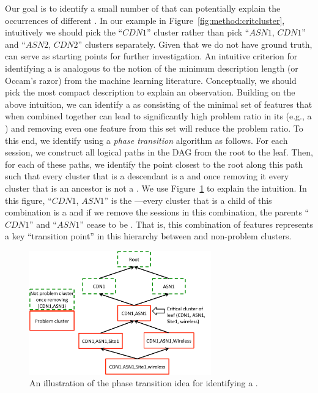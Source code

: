 Our goal is to identify a small number of {\em \criticalclusters} 
that can potentially explain the occurrences of different 
\problemclusters.  
In our example in Figure~\ref{fig:method:critcluster}, intuitively 
we should pick the ``$\mathit{CDN1}$'' cluster rather than pick 
``$\mathit{ASN1}$, $\mathit{CDN1}$'' and ``$\mathit{ASN2}$, 
$\mathit{CDN2}$'' clusters separately.
Given that we do not have ground truth, \criticalclusters can 
serve as  starting points for further investigation. 
%
An intuitive criterion for  identifying a \criticalcluster is 
analogous to the notion of the minimum description length 
(or Occam's razor) from the machine learning literature. 
Conceptually, we should pick the most  compact description
to explain an observation.  Building on the above intuition, 
we can identify a \criticalcluster as consisting of the minimal 
set of features that when combined together can lead to 
significantly high problem ratio in its \cluster
(e.g., a \problemcluster) and removing even one feature
 from this set will reduce the problem ratio. 
To this end, we identify \criticalclusters using a \emph{phase
transition} algorithm as follows. 
For each session, we construct all logical paths in the DAG 
from the root to the leaf.  
Then, for each of these paths, we identify the point closest 
to the root along this path such that every cluster that is a 
descendant  is a \problemcluster and once removing it every 
cluster that is an ancestor is not a \problemcluster.
We use Figure~\ref{fig:method:critclustr2} to explain the intuition. 
In this figure, ``$\mathit{CDN1}$, $\mathit{ASN1}$'' is the 
\criticalcluster---every cluster that is a child of
this combination is a \problemcluster and if we remove the 
sessions in this combination, the parents ``$\mathit{CDN1}$'' 
and ``$\mathit{ASN1}$'' cease to be \problemclusters.
That is, this combination of features represents a key 
``transition point'' in this hierarchy between \problemclusters 
and non-problem clusters. 



\begin{figure}[t!]
\centering
\includegraphics[width=0.7\textwidth]{figures/conext13-criticalcluster_example.pdf}
\caption{An illustration of the phase transition idea for  identifying a \criticalcluster. 
}
\label{fig:method:critclustr2}
\end{figure} 

